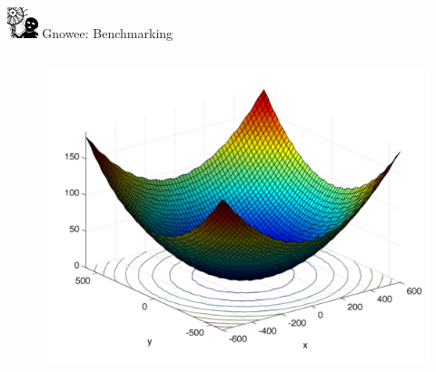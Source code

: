 \documentclass[xcolor=x11names,compress]{beamer}
\renewcommand{\(}{\begin{columns}}
\renewcommand{\)}{\end{columns}}
\newcommand{\<}[1]{\begin{column}{#1}}
\renewcommand{\>}{\end{column}}
\begin{document}
\begin{frame}{\includegraphics[width=0.35in]{../figs/Gnowee.png} Gnowee: Benchmarking \cite{Walton2013a,Yang2014,Civicioglu2013}}
\begin{columns}
\begin{column}{0.33\linewidth}
\begin{figure}[htp]
        \vspace{-0.35cm}
      \end{figure}       
      \vspace{-1.05cm} 
      \begin{figure}[htp]
        \centering
        \includegraphics[width=1.0\textwidth, height=0.25\textheight]{../figs/Griewank.png} 
        \vspace{-0.35cm}
      \end{figure}
    \end{column}
    

\end{columns}
\end{frame}
\end{document}
